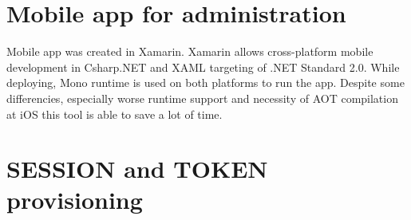 \section{Mobile app for administration}
\par
Mobile app was created in Xamarin. Xamarin allows cross-platform mobile development in Csharp.NET and XAML targeting of .NET Standard 2.0. While deploying, Mono runtime is used on both platforms to run the app. Despite some differencies, especially worse runtime support and necessity of AOT compilation at iOS this tool is able to save a lot of time. 
\section{SESSION and TOKEN provisioning}